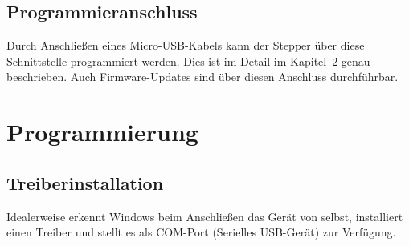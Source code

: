 \documentclass[paper=a4, open=any]{scrbook}
\begin{document}
		\section{Programmieranschluss}
			Durch Anschließen eines Micro-USB-Kabels kann der Stepper über diese Schnittstelle programmiert werden. Dies ist im Detail im Kapitel~\ref{sec:gui} genau beschrieben. Auch Firmware-Updates sind über diesen Anschluss durchführbar.

	\chapter{Programmierung}
		\label{sec:gui}
		\section{Treiberinstallation}
			Idealerweise erkennt Windows beim Anschließen das Gerät von selbst, installiert einen Treiber und stellt es als COM-Port (Serielles USB-Gerät) zur Verfügung.
			
\end{document}
